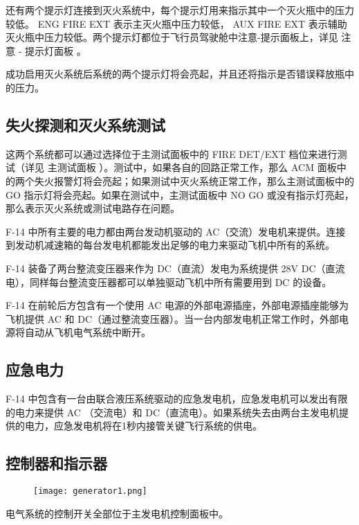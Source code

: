还有两个提示灯连接到灭火系统中，每个提示灯用来指示其中一个灭火瓶中的压力较低。 ENG FIRE EXT 表示主灭火瓶中压力较低， AUX FIRE EXT 表示辅助灭火瓶中压力较低。两个提示灯都位于飞行员驾驶舱中注意-提示面板上，详见 注意 - 提示灯面板 。

成功启用灭火系统后系统的两个提示灯将会亮起，并且还将指示是否错误释放瓶中的压力。

\subsection{失火探测和灭火系统测试}
这两个系统都可以通过选择位于主测试面板中的 FIRE DET/EXT 档位来进行测试（详见 主测试面板 ）。测试中，如果各自的回路正常工作，那么 ACM 面板中的两个失火报警灯将会亮起；如果测试中灭火系统正常工作，那么主测试面板中的 GO 指示灯将会亮起。如果在测试中，主测试面板中 NO GO 或没有指示灯亮起，那么表示灭火系统或测试电路存在问题。

F-14 中所有主要的电力都由两台发动机驱动的 AC（交流）发电机来提供。连接到发动机减速箱的每台发电机都能发出足够的电力来驱动飞机中所有的系统。

F-14 装备了两台整流变压器来作为 DC（直流）发电为系统提供 28V DC（直流电），同样每台整流变压器都可以单独驱动飞机中所有需要用到 DC 的设备。

F-14 在前轮后方包含有一个使用 AC 电源的外部电源插座，外部电源插座能够为飞机提供 AC 和 DC（通过整流变压器）。当一台内部发电机正常工作时，外部电源将自动从飞机电气系统中断开。

\subsection{应急电力}
F-14 中包含有一台由联合液压系统驱动的应急发电机，应急发电机可以发出有限的电力来提供 AC （交流电）和 DC（直流电）。如果系统失去由两台主发电机提供的电力，应急发电机将在1秒内接管关键飞行系统的供电。

\subsection{控制器和指示器}
\begin{figure}[htb]
	\centering
	\texttt{[image: generator1.png]}
\end{figure}

电气系统的控制开关全部位于主发电机控制面板中。

